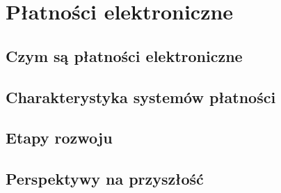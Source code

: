 
\section{Płatności elektroniczne}

\subsection{Czym są płatności elektroniczne}

\subsection{Charakterystyka systemów płatności}

\subsection{Etapy rozwoju}

\subsection{Perspektywy na przyszłość}

